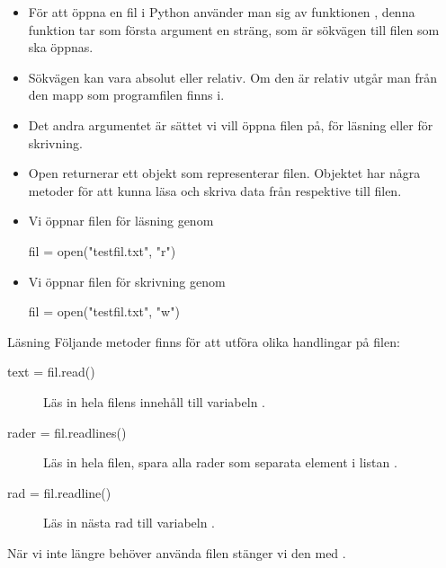 \documentclass{beamer}
\begin{document}
\begin{frame}{\insertsubsectionhead}
  \begin{itemize}
    \item För att öppna en fil i Python använder man sig av funktionen 
      , denna funktion tar som första argument en sträng, som är 
      sökvägen till filen som ska öppnas.

    \item Sökvägen kan vara absolut eller relativ. Om den är relativ utgår man 
      från den mapp som programfilen finns i.

    \item Det andra argumentet är sättet vi vill öppna filen på, för läsning 
      eller för skrivning.

  \end{itemize}
\end{frame}

\begin{frame}[fragile]{\insertsubsectionhead}
  \begin{itemize}
    \item Open returnerar ett objekt som representerar filen. Objektet har 
      några metoder för att kunna läsa och skriva data från respektive till 
      filen.

    \item Vi öppnar filen  för läsning genom
      \begin{src}[language=python]
fil = open("testfil.txt", "r")
      \end{src}

    \item Vi öppnar filen för skrivning genom
      \begin{src}[language=python]
fil = open("testfil.txt", "w")
      \end{src}
  \end{itemize}
\end{frame}

\begin{frame}{\insertsubsectionhead}{Läsning}
  Följande metoder finns för att utföra olika handlingar på filen:

  \begin{description}
    \item[text = fil.read()] Läs in hela filens innehåll till variabeln
      .

    \item[rader = fil.readlines()] Läs in hela filen, spara alla rader
      som separata element i listan .

    \item[rad = fil.readline()] Läs in nästa rad till variabeln
      .

  \end{description}

  När vi inte längre behöver använda filen stänger vi den med 
  .
\end{frame}
\end{document}
